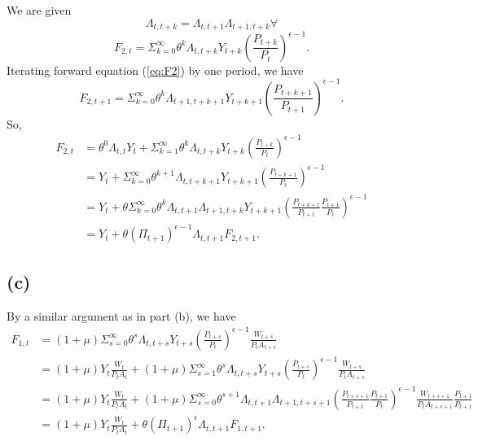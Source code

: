 \documentclass[12pt]{article}
\begin{document}
We are given 
\begin{equation}
\label{eq:lambda}
\Lambda_{t,t+k} = \Lambda_{t,t+1}\Lambda_{t+1,t+k} \forall
\end{equation}
\begin{equation}
\label{eq:F2}
F_{2,t} = \Sigma^{\infty}_{k=0}\theta^{k}\Lambda_{t,t+k}Y_{t+k}\left(\frac{P_{t+k}}{P_{t}}\right)^{\epsilon-1}.
\end{equation}
Iterating forward equation (\ref{eq:F2}) by one period, we have
\begin{equation}
\label{eq:F2prime}
F_{2,t+1} = \Sigma^{\infty}_{k=0}\theta^{k}\Lambda_{t+1,t+k+1}Y_{t+k+1}\left(\frac{P_{t+k+1}}{P_{t+1}}\right)^{\epsilon-1}.
\end{equation}
So,
\begin{align*}
F_{2,t} &= \theta^{0}\Lambda_{t,t}Y_{t} + \Sigma^{\infty}_{k=1} \theta^{k}\Lambda_{t,t+k}Y_{t+k}\left(\frac{P_{t+k}}{P_{t}}\right)^{\epsilon-1} \\
&= Y_{t} + \Sigma^{\infty}_{k=0} \theta^{k+1}\Lambda_{t,t+k+1}Y_{t+k+1}\left(\frac{P_{t+k+1}}{P_{t}}\right)^{\epsilon-1} \\
&= Y_{t} + \theta \Sigma^{\infty}_{k=0} \theta^{k}\Lambda_{t,t+1}\Lambda_{t+1,t+k}Y_{t+k+1}\left(\frac{P_{t+k+1}}{P_{t+1}}\frac{P_{t+1}}{P_{t}}\right)^{\epsilon-1} \\
&= Y_{t} + \theta\left(\Pi_{t+1}\right)^{\epsilon-1}\Lambda_{t,t+1}F_{2,t+1}.
\end{align*}

\subsection*{(c)}

By a similar argument as in part (b), we have
\begin{align*}
\label{eq:F1}
F_{1,t} &=\left(1+\mu\right)\Sigma^{\infty}_{s=0}\theta^{s}\Lambda_{t,t+s}Y_{t+s}\left(\frac{P_{t+s}}{P_{t}}\right)^{\epsilon-1}\frac{W_{t+s}}{P_{t}A_{t+s}} \\
&= \left(1+\mu\right)Y_{t}\frac{W_{t}}{P_{t}A_{t}} + \left(1+\mu\right)\Sigma^{\infty}_{s=1}\theta^{s}\Lambda_{t,t+s}Y_{t+s}\left(\frac{P_{t+s}}{P_{t}}\right)^{\epsilon-1}\frac{W_{t+s}}{P_{t}A_{t+s}} \\
&= \left(1+\mu\right)Y_{t}\frac{W_{t}}{P_{t}A_{t}} + \left(1+\mu\right)\Sigma^{\infty}_{s=0}\theta^{s+1}\Lambda_{t,t+1}\Lambda_{t+1,t+s+1}\left(\frac{P_{t+s+1}}{P_{t+1}}\frac{P_{t+1}}{P_{t}}\right)^{\epsilon-1}\frac{W_{t+s+1}}{P_{t}A_{t+s+1}}\frac{P_{t+1}}{P_{t+1}} \\
&= \left(1+\mu\right)Y_{t}\frac{W_{t}}{P_{t}A_{t}} + \theta\left(\Pi_{t+1}\right)^{\epsilon}\Lambda_{t,t+1}F_{1,t+1}.
\end{align*}
\end{document}

